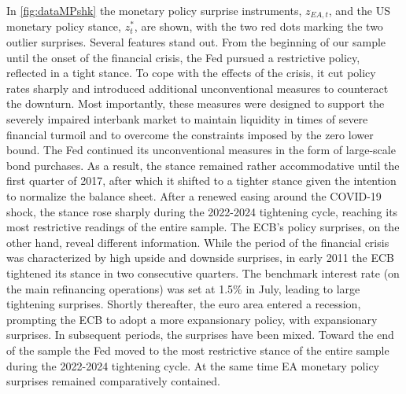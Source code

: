 
In \autoref{fig:dataMPshk} the monetary policy surprise instruments, $z_{EA,t}$, and the US monetary policy stance, $z_t^\ast$, are shown, with the two red dots marking the two outlier surprises. Several features stand out. From the beginning of our sample until the onset of the financial crisis, the Fed pursued a restrictive policy, reflected in a tight stance. To cope with the effects of the crisis, it cut policy rates sharply and introduced additional unconventional measures to counteract the downturn. Most importantly, these measures were designed to support the severely impaired interbank market to maintain liquidity in times of severe financial turmoil and to overcome the constraints imposed by the zero lower bound. The Fed continued its unconventional measures in the form of large-scale bond purchases. As a result, the stance remained rather accommodative until the first quarter of 2017, after which it shifted to a tighter stance given the intention to normalize the balance sheet. After a renewed easing around the COVID-19 shock, the stance rose sharply during the 2022-2024 tightening cycle, reaching its most restrictive readings of the entire sample.
The ECB's policy surprises, on the other hand, reveal different information. While the period of the financial crisis was characterized by high upside and downside surprises, in early 2011 the ECB tightened its stance in two consecutive quarters. The benchmark interest rate (on the main refinancing operations) was set at 1.5\% in July, leading to large tightening surprises. Shortly thereafter, the euro area entered a recession, prompting the ECB to adopt a more expansionary policy, with expansionary surprises. In subsequent periods, the surprises have been mixed. Toward the end of the sample the Fed moved to the most restrictive stance of the entire sample during the 2022-2024 tightening cycle. At the same time EA monetary policy surprises remained comparatively contained. 


